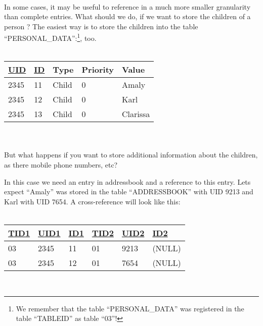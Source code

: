 \\
In some cases, it may be useful to reference in a much more smaller granularity than complete entries. What should we do, if we want to store the children of a person ? 
The easiest way is to store the children into the table ``PERSONAL\_DATA'':\footnote{We remember that the table ``PERSONAL\_DATA'' was registered in the table ``TABLEID'' as table ``03''!}, too.\\
\\
\begin{tabular}[ht]{|l|l|l|l|l|}
\hline
\underline{UID} & \underline{ID} & Type & Priority & Value\\
\hline
 2345&  11& Child & 0 & Amaly \\
\hline
 2345&  12& Child & 0 & Karl \\
\hline
 2345&  13& Child & 0 & Clarissa\\
\hline
\end{tabular}\\
\\

But what happens if you want to store additional information about the children, as there mobile phone numbers, etc?

In this case we need an entry in addressbook and a reference to this entry. Lets expect ``Amaly'' was stored in the table ``ADDRESSBOOK'' with UID 9213 and Karl with UID 7654. A cross-reference will look like this:\\
\\
\begin{tabular}[ht]{|l|l|l|l|l|l|}
\hline
\underline{TID1} & \underline{UID1} & \underline{ID1} & \underline{TID2} & \underline{UID2} & \underline{ID2} \\
\hline
 03& 2345& 11& 01& 9213& (NULL) \\
\hline
 03& 2345& 12& 01& 7654& (NULL) \\
\hline
\end{tabular}
\\
